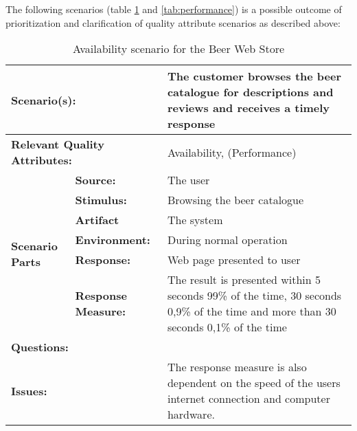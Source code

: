 The following scenarios (table \ref{tab:availability} and \ref{tab:performance}) is a possible outcome of prioritization and clarification of quality attribute scenarios as described above:

\begin{table}[H]
\begin{center}
\begin{tabular}{|p{0.3cm}|p{2.5cm}|p{8cm}|}
  \hline
  \multicolumn{2}{|p{3cm}|}{\bfseries Scenario(s):} & The customer browses the beer catalogue for descriptions and reviews and receives a timely response \\
  \hline
  \multicolumn{2}{|p{3cm}|}{\bfseries Relevant Quality Attributes:} & Availability, (Performance) \\
  \hline
  \multirow{6}{*}{\begin{sideways}{\bfseries Scenario Parts}\end{sideways}}
  & {\bfseries Source:} & The user \\
  \cline{2-3}
  & {\bfseries Stimulus:} & Browsing the beer catalogue \\
  \cline{2-3}
  & {\bfseries Artifact} & The system \\
  \cline{2-3}
  & {\bfseries Environment:} & During normal operation \\
  \cline{2-3}
  & {\bfseries Response:} & Web page presented to user \\
  \cline{2-3}
  & {\bfseries Response Measure:} & The result is presented within 5 seconds 99\% of the time, 30 seconds 0,9\% of the time and more than 30 seconds 0,1\% of the time \\
  \hline
  \multicolumn{2}{|p{3cm}|}{\bfseries Questions:} & \\
  \hline
  \multicolumn{2}{|p{3cm}|}{\bfseries Issues:} & The response measure is also dependent on the speed of the users internet connection and computer hardware. \\
  \hline
\end{tabular}
\caption{Availability scenario for the Beer Web Store}
\label{tab:availability}
\end{center}
\end{table}


